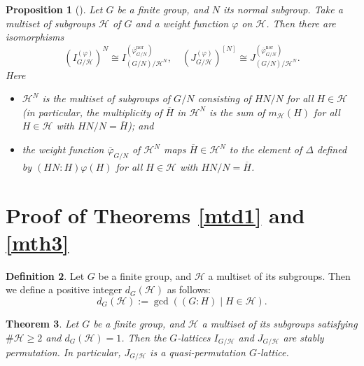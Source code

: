 \documentclass[12pt]{amsart}
\theoremstyle{plain}
\newtheorem{thm}{Theorem}[section]
\newtheorem{prop}[thm]{Proposition}
\theoremstyle{definition}
\newtheorem{dfn}[thm]{Definition}
\numberwithin{thm}{section}
\numberwithin{equation}{section}
\newcommand{\cH}{\mathcal{H}}
\DeclareMathOperator{\nor}{nor}
\begin{document}
\begin{prop}[{\cite[Proposition 3.22]{Hasegawa}}]\label{prop:tkfx}
Let $G$ be a finite group, and $N$ its normal subgroup. Take a multiset of subgroups $\cH$ of $G$ and a weight function $\varphi$ on $\cH$. Then there are isomorphisms
\begin{equation*}
(I_{G/\cH}^{(\varphi)})^{N}\cong I_{(G/N)/\cH^{N}}^{(\overline{\varphi}_{G/N}^{\nor})}, \quad 
(J_{G/\cH}^{(\varphi)})^{[N]}\cong J_{(G/N)/\cH^{N}}^{(\overline{\varphi}_{G/N}^{\nor})}. 
\end{equation*}
Here
\begin{itemize}
\item $\cH^{N}$ is the multiset of subgroups of $G/N$ consisting of $HN/N$ for all $H\in \cH$ (in particular, the multiplicity of $\overline{H}$ in $\cH^{N}$ is the sum of $m_{\cH}(H)$ for all $H\in \cH$ with $HN/N=\overline{H}$); and
\item the weight function $\overline{\varphi}_{G/N}$ of $\cH^{N}$ maps $\overline{H}\in \cH^{N}$ to the element of $\Delta$ defined by $(HN:H)\varphi(H)$ for all $H\in \cH$ with $HN/N=\overline{H}$. 
\end{itemize}
\end{prop}

\section{Proof of Theorems \ref{mtd1} and \ref{mth3}}\label{sect:pf13}

\begin{dfn}
Let $G$ be a finite group, and $\cH$ a multiset of its subgroups. Then we define a positive integer $d_{G}(\cH)$ as follows: 
\begin{equation*}
    d_{G}(\cH):=\gcd((G:H)\mid H\in \cH). 
\end{equation*}
\end{dfn}

\begin{thm}\label{thm:gcdo}
Let $G$ be a finite group, and $\cH$ a multiset of its subgroups satisfying $\#\cH \geq 2$ and $d_{G}(\cH)=1$. Then the $G$-lattices $I_{G/\cH}$ and $J_{G/\cH}$ are stably permutation. In particular, $J_{G/\cH}$ is a quasi-permutation $G$-lattice. 
\end{thm}
\end{document}
